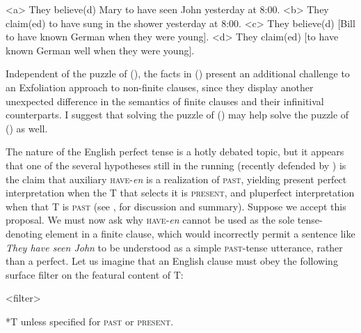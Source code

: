 \documentclass[output=paper]{langscibook}
\begin{document}
\a<a> They believe(d) Mary to have seen John yesterday at 8:00.
\a<b> They claim(ed) to have sung in the shower yesterday at 8:00.
\a<c> They believe(d) [Bill to have known German when they were young].
\a<d> They claim(ed) [to have known German well when they were young].
\xe

\noindent Independent of the puzzle of \noindent (), the facts in \noindent () present an additional challenge to an Exfoliation approach to non-finite clauses, since they display another unexpected difference in the semantics of finite clauses and their infinitival counterparts. I suggest that solving the puzzle of \noindent () may help solve the puzzle of \noindent () as well.

The nature of the English perfect tense is a hotly debated topic, but it appears that one of the several hypotheses still in the running (recently defended by \citealt{KlechaPerfect}) is the claim that auxiliary \textsc{have-}\textit{en }is a realization of \textsc{past, }yielding present perfect interpretation when the T that selects it is \textsc{present, }and pluperfect interpretation when that T is \textsc{past (}see \citealt[Section 3 (esp. 3.1)]{GrOnn:2021aa}, for discussion and summary). Suppose we accept this proposal. We must now ask why \textsc{have-}\textit{en }cannot be used as the sole tense-denoting element in a finite clause, which would incorrectly permit a sentence like \textit{They have seen John }to be understood as a simple \textsc{past}-tense utterance, rather than a perfect. Let us imagine that an English clause must obey the following surface filter on the featural content of T:

\pex<filter>

*T unless specified for \textsc{past} or \textsc{present}.
\xe

\newpage
\end{document}
